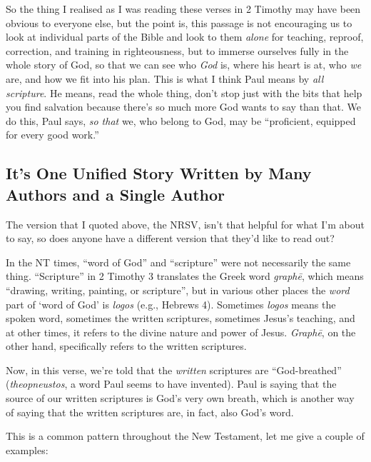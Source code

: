 So the thing I realised as I was reading these verses in 2 Timothy may have been
obvious to everyone else, but the point is, this passage is not encouraging us
to look at individual parts of the Bible and look to them \textit{alone} for
teaching, reproof, correction, and training in righteousness, but to immerse
ourselves fully in the whole story of God, so that we can see who \textit{God}
is, where his heart is at, who \textit{we} are, and how we fit into his plan.
This is what I think Paul means by \textit{all scripture}. He means, read the
whole thing, don't stop just with the bits that help you find salvation because
there's so much more God wants to say than that. We do this, Paul says,
\textit{so that} we, who belong to God, may be \enquote{proficient, equipped for
every good work.}

\subsection{It's One Unified Story Written by Many Authors and a Single
Author}

The version that I quoted above, the NRSV, isn't that helpful for what I'm
about to say, so does anyone have a different version that they'd like to read
out?

In the NT times, \enquote{word of God} and \enquote{scripture} were not
necessarily the same thing. \enquote{Scripture} in 2 Timothy 3 translates the
Greek word \textit{graph\={e}}, which means \enquote{drawing, writing, painting,
or scripture}, but in various other places the \textit{word} part of `word of
God' is \textit{logos} (e.g., Hebrews 4). Sometimes \textit{logos} means the
spoken word, sometimes the written scriptures, sometimes Jesus's teaching, and
at other times, it refers to the divine nature and power of Jesus.
\textit{Graph\={e}}, on the other hand, specifically refers to the written
scriptures.

Now, in this verse, we're told that the \textit{written} scriptures are
\enquote{God-breathed} (\textit{theopneustos}, a word Paul seems to have
invented). Paul is saying that the source of our written scriptures is God's
very own breath, which is another way of saying that the written scriptures are,
in fact, also God's word.

This is a common pattern throughout the New Testament, let me give a couple of
examples:

